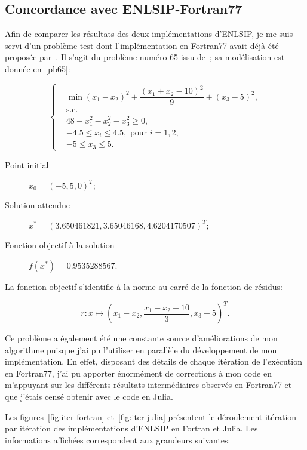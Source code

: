\subsection{Concordance avec ENLSIP-Fortran77}\label{compa_fortran}

Afin de comparer les résultats des deux implémentations d'ENLSIP, je me suis servi d'un problème test dont l'implémentation en Fortran77 avait déjà été proposée par~\citet{lindwedin88}.
Il s'agit du problème numéro 65 issu de~\cite{hockschi}; sa modélisation est donnée en~\eqref{pb65}:

\begin{equation}\label{pb65}
\left\{  
\begin{aligned}
&\min (x_1-x_2)^2 + \dfrac{(x_1+x_2-10)^2}{9}+(x_3-5)^2, \\ 
&\text{s.c.}\\
& 48-x_1^2-x_2^2-x_3^2 \geq 0,\\
&-4.5\leq x_i \leq 4.5,\text{ pour } i=1,2,\\
&-5 \leq x_3  \leq 5.
\end{aligned}  \right.
\end{equation}

\begin{description}
    \item[Point initial] $x_0 = (-5,5,0)^T$;
    \item[Solution attendue] $x^* = (3.650461821,3.65046168,4.6204170507)^T$;
    \item[Fonction objectif à la solution] $f(x^*) = 0.9535288567$.
\end{description}

La fonction objectif s'identifie à la norme au carré de la fonction de résidus:

\[ r : x\longmapsto  \left(x_1-x_2,\dfrac{x_1-x_2-10}{3},x_3-5\right)^T.\]


 Ce problème a également été une constante source d'améliorations de mon algorithme puisque j'ai pu l'utiliser en parallèle du développement de mon implémentation.
En effet, disposant des détails de chaque itération de l'exécution en Fortran77, j'ai pu apporter énormément de corrections à mon code en m'appuyant sur les différents résultats
intermédiaires observés en Fortran77 et que j'étais censé obtenir avec le code en Julia.

Les figures~\ref{fig:iter fortran} et~\ref{fig:iter julia} présentent le déroulement itération par itération des implémentations d'ENLSIP en Fortran et Julia. 
Les informations affichées correspondent aux grandeurs suivantes:

